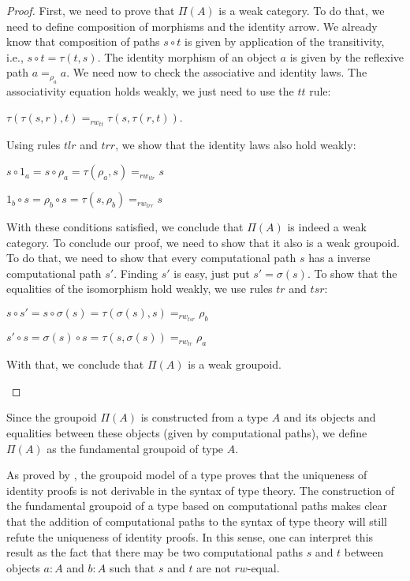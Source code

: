 \documentclass[12pt, a4paper,  oneside, headinclude,footinclude, BCOR5mm]{scrartcl}
\begin{document}
\begin{proof}

First, we need to prove that $\Pi(A)$ is a weak category. To do that, we need to define composition of morphisms and the identity arrow. We already know that composition of paths $s \circ t$ is given by application of the transitivity, i.e., $s \circ t = \tau(t,s)$. The identity morphism of an object $a$ is given by the reflexive path $a =_{\rho_{a}} a$. We need now to check the associative and identity laws. The associativity equation holds weakly, we just need to use the $tt$ rule:

\begin{center}
$\tau(\tau(s,r),t) =_{rw_{tt}} \tau(s,\tau(r,t))$.
\end{center}

Using rules $tlr$ and $trr$, we show that the identity laws also hold weakly:

\begin{center}
$s \circ 1_{a} = s \circ \rho_{a} = \tau(\rho_{a},s) =_{rw_{tlr}} s$

$1_{b} \circ s = \rho_{b} \circ s = \tau(s,\rho_{b}) =_{rw_{trr}} s$

\end{center}

With these conditions satisfied, we conclude that $\Pi(A)$ is indeed a weak category. To conclude our proof, we need to show that it also is a weak groupoid. To do that, we need to show that every computational path $s$ has a inverse computational path $s'$. Finding $s'$ is easy, just put $s' = \sigma(s)$. To show that the equalities of the isomorphism hold weakly, we use rules $tr$ and $tsr$:

\begin{center}

$s \circ s' = s \circ \sigma(s) = \tau(\sigma(s),s) =_{rw_{tsr}} \rho_{b}$

$s' \circ s = \sigma(s) \circ s = \tau(s,\sigma(s)) =_{rw_{tr}} \rho_{a}$

With that, we conclude that $\Pi(A)$ is a weak groupoid.

\end{center}
\end{proof}

Since the groupoid $\Pi(A)$ is constructed from a type $A$ and its objects and equalities between these objects (given by computational paths), we define $\Pi(A)$ as the fundamental groupoid of type $A$.

As proved by \cite{Streicher2}, the groupoid model of a type proves that the uniqueness of identity proofs is not derivable in the syntax of type theory. The construction of the fundamental groupoid of a type based on computational paths makes clear that the addition of computational paths to the syntax of type theory will still refute the uniqueness of identity proofs. In this sense, one can interpret this result as the fact that there may be two computational paths $s$ and $t$ between objects $a : A$ and $b : A$ such that $s$ and $t$ are not $rw$-equal.
\end{document}
